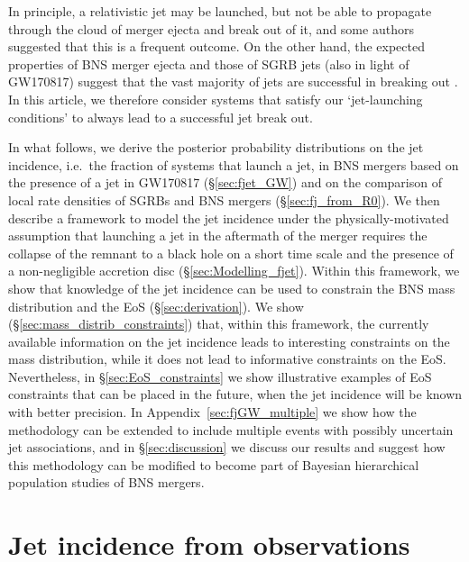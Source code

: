 \documentclass[]{aa}
\newcommand{\resp}[1]{#1}
\begin{document}
In principle, a relativistic jet may be launched, but not be able to propagate through the cloud of merger ejecta and break out of it, and some authors suggested \citep[e.g.][]{Moharana2017} that this is a frequent outcome. On the other hand, the expected properties of BNS merger ejecta and those of SGRB jets (also in light of GW170817) suggest that the vast majority of jets are successful in breaking out \citep{Duffell2018,Beniamini2019,Salafia2020}. \resp{In this article, we therefore consider systems that satisfy our `jet-launching conditions' to always lead to a successful jet break out.}

\resp{In what follows,} we derive the posterior probability distributions on the \resp{jet incidence, i.e.\ the fraction of systems that launch a jet,} in BNS mergers based on the presence of a jet in GW170817 (\S\ref{sec:fjet_GW}) and on the comparison of local rate densities of SGRBs and BNS mergers (\S\ref{sec:fj_from_R0}). We then describe a framework to model the jet \resp{incidence} under the physically-motivated assumption that launching a jet in the aftermath of the merger requires the collapse of the remnant to a black hole on a short time scale and the presence of a non-negligible accretion disc (\S\ref{sec:Modelling_fjet}). Within this framework, we show that knowledge of the jet \resp{incidence} can be used to constrain the BNS mass distribution and the EoS (\S\ref{sec:derivation}). We show (\S\ref{sec:mass_distrib_constraints}) that, within this framework, the currently available information on the jet \resp{incidence} leads to interesting constraints on the mass distribution, while it does not lead to informative constraints on the EoS.  Nevertheless, in \S\ref{sec:EoS_constraints} we show illustrative examples of EoS constraints that can be placed in the future, when the jet \resp{incidence} will be known with better precision. In Appendix~\ref{sec:fjGW_multiple} we show how the methodology can be extended to include multiple events with possibly uncertain jet associations, and in  \S\ref{sec:discussion} we discuss our results and suggest how this methodology can be modified to become part of Bayesian hierarchical population studies of BNS mergers.


\section{Jet incidence from observations}
\label{sec:fjet_estimation}
\end{document}
